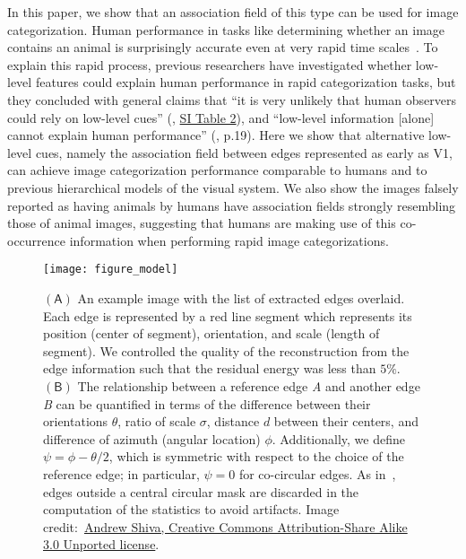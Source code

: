 \documentclass{article}%
\begin{document}
In this paper, we show that an association field of this type can be
used for image categorization.  Human performance in tasks like
determining whether an image contains an animal is surprisingly
accurate even at very rapid time scales~\cite{Thorpe96}.  To explain
this rapid process, previous researchers have investigated whether
low-level features could explain human performance in rapid
categorization tasks, but they concluded with general claims that ``it
is very unlikely that human observers could rely on low-level cues''
(\citealp{Serre07},
\href{http://www.pnas.org/content/suppl/2007/03/23/0700622104.DC1/00622Table2.pdf}{SI
  Table 2}), and ``low-level information [alone] cannot explain human
performance'' (\citealp{Drewes11}, p.19).  Here we show that 
alternative low-level cues, namely the association field between edges
represented as early as V1, can achieve image
categorization performance comparable to humans and to previous
hierarchical models of the visual system.  We also show the images
falsely reported as having animals by humans have association fields
strongly resembling those of animal images, suggesting that humans are
making use of this co-occurrence information when performing rapid
image categorizations.


\begin{figure}[p]%
\centering%
\texttt{[image: figure\_model]}%
\caption{ 
$\mathsf{(A)}$ An example image with the list of extracted edges overlaid.  
Each edge is represented by a red line segment which represents its position (center of segment), orientation, and scale (length of segment). 
We controlled the quality of the reconstruction from the edge information such
that the residual energy was less than $5\%$.
$\mathsf{(B)}$ The relationship between a reference edge \emph{A} and another
edge \emph{B} can be quantified in terms of the difference between their
orientations $\theta$, 
ratio of scale $\sigma$, %
distance $d$ between their centers, 
and difference of azimuth (angular location) $\phi$. %
Additionally, we define $\psi=\phi - \theta/2$, which is
symmetric with respect to the choice of the reference edge; 
in particular, $\psi=0$ for co-circular edges. %
As in~\citet{Geisler01}, edges outside a central circular mask are discarded in the computation of the statistics to avoid artifacts. 
%
Image credit:~\href{https://commons.wikimedia.org/wiki/File:Elephant_\%28Loxodonta_Africana\%29_05.jpg}{Andrew Shiva, Creative Commons Attribution-Share Alike 3.0 Unported license}.
\label{fig:model} %
 } %
\end{figure} %
\end{document}
